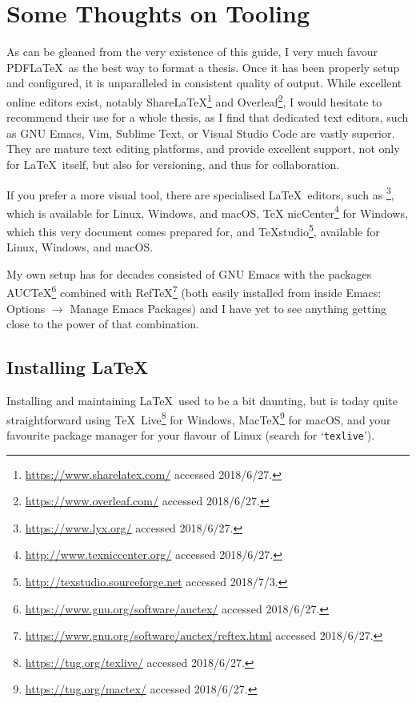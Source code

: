 
\chapter*{Some Thoughts on Tooling}
\label{cha:some-thoughts-tool}


As can be gleaned from the very existence of this guide, I very much
favour PDF\LaTeX\ as the best way to format a thesis. Once it has been
properly setup and configured, it is unparalleled in consistent
quality of output.  While excellent online editors exist, notably
Share\LaTeX\footnote{\url{https://www.sharelatex.com/} accessed 2018/6/27.} and
Overleaf\footnote{\url{https://www.overleaf.com/} accessed 2018/6/27.}, I would hesitate
to recommend their use for a whole thesis, as I find that dedicated
text editors, such as GNU Emacs, Vim, Sublime Text, or Visual Studio
Code are vastly superior.  They are mature text editing platforms, and
provide excellent support, not only for \LaTeX\ itself, but also for
versioning, and thus for collaboration.

If you prefer a more visual tool, there are specialised \LaTeX\
editors, such as \mLyX\footnote{\url{https://www.lyx.org/} accessed
  2018/6/27.}, which is available for Linux, Windows, and macOS, \TeX
nicCenter\footnote{\url{http://www.texniccenter.org/} accessed
  2018/6/27.} for Windows, which this very document comes prepared
for, and \TeX studio\footnote{\url{http://texstudio.sourceforge.net}
  accessed 2018/7/3.}, available for Linux, Windows, and macOS.

My own setup has for decades consisted of GNU Emacs with the packages
AUC\TeX\footnote{\url{https://www.gnu.org/software/auctex/} accessed 2018/6/27.} combined
with
Ref\TeX\footnote{\url{https://www.gnu.org/software/auctex/reftex.html} accessed 2018/6/27.}
(both easily installed from inside Emacs: Options $\rightarrow$ Manage
Emacs Packages) and I have yet to see anything getting close to the
power of that combination.

\section*{Installing \LaTeX}
\label{sec:installing-latex}

Installing and maintaining \LaTeX\ used to be a bit daunting, but is today
quite straightforward using \TeX\
Live\footnote{\url{https://tug.org/texlive/} accessed 2018/6/27.} for Windows,
Mac\negthinspace\TeX\footnote{\url{https://tug.org/mactex/} accessed 2018/6/27.} for mac\-OS, and your
favourite package manager for your flavour of Linux (search for `\texttt{texlive}').

